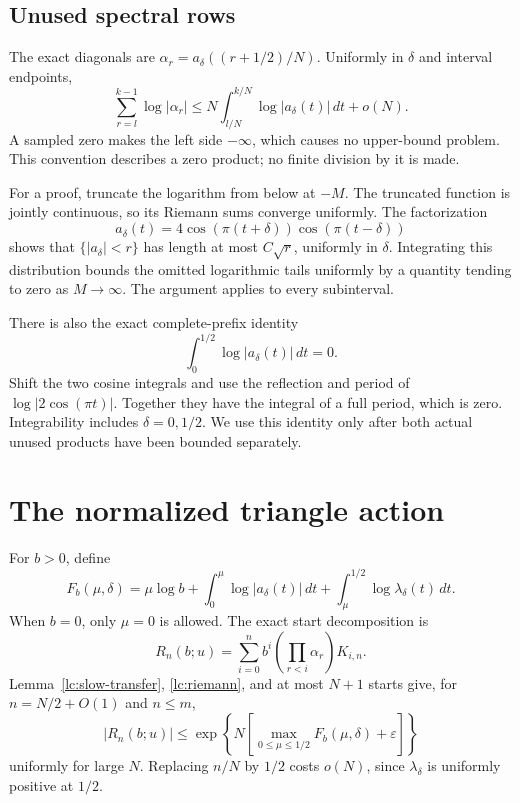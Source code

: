 \documentclass[11pt]{article}
\numberwithin{equation}{section}
\theoremstyle{remark}\newtheorem{remark}[theorem]{Remark}
\begin{document}
\subsection{Unused spectral rows}
The exact diagonals are \(\alpha_r=a_\delta((r+1/2)/N)\).
Uniformly in \(\delta\) and interval endpoints,
\begin{equation}\label{lc:riemann}
 \sum_{r=l}^{k-1}\log|\alpha_r|
 \le N\int_{l/N}^{k/N}\log|a_\delta(t)|\,dt+o(N).
\end{equation}
A sampled zero makes the left side \(-\infty\), which causes no
upper-bound problem. This convention describes a zero product;
no finite division by it is made.

For a proof, truncate the logarithm from below at \(-M\).
The truncated function is jointly continuous, so its Riemann sums
converge uniformly. The factorization
\[
 a_\delta(t)=4\cos(\pi(t+\delta))\cos(\pi(t-\delta))
\]
shows that \(\{|a_\delta|<r\}\) has length at most \(C\sqrt r\),
uniformly in \(\delta\). Integrating this distribution bounds the
omitted logarithmic tails uniformly by a quantity tending to zero
as \(M\to\infty\). The argument applies to every subinterval.

There is also the exact complete-prefix identity
\begin{equation}\label{lc:prefix-zero}
                   \int_0^{1/2}\log|a_\delta(t)|\,dt=0 .
\end{equation}
Shift the two cosine integrals and use the reflection and period
of \(\log|2\cos(\pi t)|\). Together they have the integral of a full
period, which is zero. Integrability includes \(\delta=0,1/2\).
We use this identity only after both actual unused products have
been bounded separately.

\section{The normalized triangle action}\label{lc:action}
For \(b>0\), define
\begin{equation}\label{lc:F}
 F_b(\mu,\delta)=\mu\log b+
 \int_0^\mu\log|a_\delta(t)|\,dt+
 \int_\mu^{1/2}\log\lambda_\delta(t)\,dt .
\end{equation}
When \(b=0\), only \(\mu=0\) is allowed. The exact start decomposition is
\[
 R_n(b;u)=\sum_{i=0}^n b^i
              \left(\prod_{r<i}\alpha_r\right)K_{i,n}.
\]
Lemma~\ref{lc:slow-transfer}, \eqref{lc:riemann}, and at most \(N+1\)
starts give, for \(n=N/2+O(1)\) and \(n\le m\),
\begin{equation}\label{lc:cofactor-rate}
 |R_n(b;u)|\le
 \exp\left\{N\left[\max_{0\le\mu\le1/2}F_b(\mu,\delta)
                                      +\varepsilon\right]\right\}
\end{equation}
uniformly for large \(N\). Replacing \(n/N\) by \(1/2\) costs \(o(N)\),
since \(\lambda_\delta\) is uniformly positive at \(1/2\).
\end{document}
